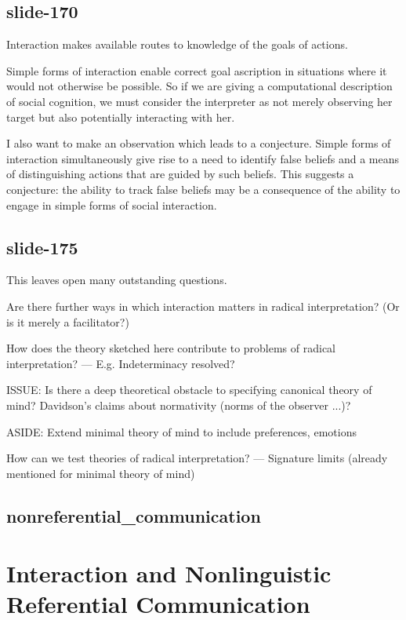 \documentclass[12pt,\papersize]{extarticle}
\begin{document}
\subsection{slide-170}
Interaction makes available routes to knowledge of the goals of actions.


Simple forms of interaction enable correct goal ascription in
situations where it would not otherwise be possible.
So if we are giving a computational description of
social cognition, we must consider the interpreter as not merely
observing her target but also potentially interacting with her.

I also want to make an observation which leads to a conjecture.
Simple forms of interaction simultaneously give rise to a
need to identify false beliefs and a means of distinguishing
actions that are guided by such beliefs.
This suggests a conjecture: the ability to track false beliefs may be a
consequence of the ability to engage in simple forms of social interaction.

\subsection{slide-175}
This leaves open many outstanding questions.

Are there further ways in which interaction matters in radical
interpretation? (Or is it merely a facilitator?)

How does the theory sketched here contribute to problems of radical interpretation?
--- E.g. Indeterminacy resolved?

ISSUE: Is there a deep theoretical
obstacle to specifying canonical theory of mind?  Davidson’s
claims about normativity (norms of the observer ...)?

ASIDE: Extend minimal theory of mind to include preferences, emotions

How can we test theories of radical interpretation?
--- Signature limits (already mentioned for minimal theory of mind)

\subsection{nonreferential\_communication}


\section{Interaction and Nonlinguistic Referential Communication}
\end{document}
